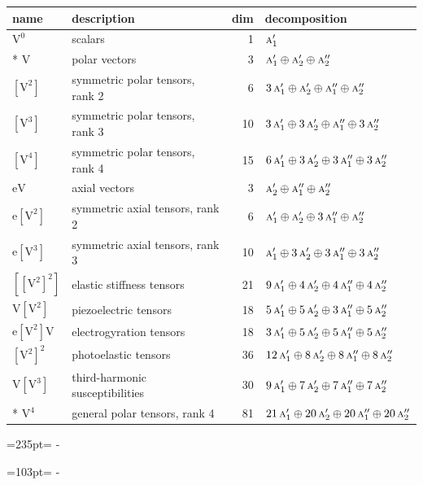 \documentclass[10pt,a4paper]{article}
\newcommand{\needspace}[1]{\par\penalty-100\begingroup\dimen0=#1\relax\dimen2=\pagegoal
  \advance\dimen2-\pagetotal\ifdim\dimen0>\dimen2\relax\ifdim\dimen2>0pt\vfil\break\fi\fi
  \endgroup}
\numberwithin{equation}{section}
\newcommand{\irr}[1]{\text{\normalfont\scshape #1}}
\newcommand{\jahn}[1]{\mathrm{#1}}
\newlength{\fillwidth}\newlength{\cellwidth}\newlength{\colwidth}
\begin{document}
{\begin{longtable}{@{}llr>{\RaggedRight\arraybackslash}p{\fillwidth}@{}}
name & description & dim & decomposition\\\midrule\endhead
\bottomrule\endfoot\endlastfoot
$\jahn{V^{0}}$ & scalars & 1 & $\irr{a}_{1}'$\\*
$\jahn{V}$ & polar vectors & 3 & $\irr{a}_{1}' \oplus\allowbreak \irr{a}_{2}' \oplus\allowbreak \irr{a}_{2}''$\\
$\jahn{[V^{2}]}$ & symmetric polar tensors, rank 2 & 6 & $3\,\irr{a}_{1}' \oplus\allowbreak \irr{a}_{2}' \oplus\allowbreak \irr{a}_{1}'' \oplus\allowbreak \irr{a}_{2}''$\\
$\jahn{[V^{3}]}$ & symmetric polar tensors, rank 3 & 10 & $3\,\irr{a}_{1}' \oplus\allowbreak 3\,\irr{a}_{2}' \oplus\allowbreak \irr{a}_{1}'' \oplus\allowbreak 3\,\irr{a}_{2}''$\\
$\jahn{[V^{4}]}$ & symmetric polar tensors, rank 4 & 15 & $6\,\irr{a}_{1}' \oplus\allowbreak 3\,\irr{a}_{2}' \oplus\allowbreak 3\,\irr{a}_{1}'' \oplus\allowbreak 3\,\irr{a}_{2}''$\\
$\jahn{eV}$ & axial vectors & 3 & $\irr{a}_{2}' \oplus\allowbreak \irr{a}_{1}'' \oplus\allowbreak \irr{a}_{2}''$\\
$\jahn{e[V^{2}]}$ & symmetric axial tensors, rank 2 & 6 & $\irr{a}_{1}' \oplus\allowbreak \irr{a}_{2}' \oplus\allowbreak 3\,\irr{a}_{1}'' \oplus\allowbreak \irr{a}_{2}''$\\
$\jahn{e[V^{3}]}$ & symmetric axial tensors, rank 3 & 10 & $\irr{a}_{1}' \oplus\allowbreak 3\,\irr{a}_{2}' \oplus\allowbreak 3\,\irr{a}_{1}'' \oplus\allowbreak 3\,\irr{a}_{2}''$\\
$\jahn{[[V^{2}]^{2}]}$ & elastic stiffness tensors & 21 & $9\,\irr{a}_{1}' \oplus\allowbreak 4\,\irr{a}_{2}' \oplus\allowbreak 4\,\irr{a}_{1}'' \oplus\allowbreak 4\,\irr{a}_{2}''$\\
$\jahn{V[V^{2}]}$ & piezoelectric tensors & 18 & $5\,\irr{a}_{1}' \oplus\allowbreak 5\,\irr{a}_{2}' \oplus\allowbreak 3\,\irr{a}_{1}'' \oplus\allowbreak 5\,\irr{a}_{2}''$\\
$\jahn{e[V^{2}]V}$ & electrogyration tensors & 18 & $3\,\irr{a}_{1}' \oplus\allowbreak 5\,\irr{a}_{2}' \oplus\allowbreak 5\,\irr{a}_{1}'' \oplus\allowbreak 5\,\irr{a}_{2}''$\\
$\jahn{[V^{2}]^{2}}$ & photoelastic tensors & 36 & $12\,\irr{a}_{1}' \oplus\allowbreak 8\,\irr{a}_{2}' \oplus\allowbreak 8\,\irr{a}_{1}'' \oplus\allowbreak 8\,\irr{a}_{2}''$\\
$\jahn{V[V^{3}]}$ & third-harmonic susceptibilities & 30 & $9\,\irr{a}_{1}' \oplus\allowbreak 7\,\irr{a}_{2}' \oplus\allowbreak 7\,\irr{a}_{1}'' \oplus\allowbreak 7\,\irr{a}_{2}''$\\*
$\jahn{V^{4}}$ & general polar tensors, rank 4 & 81 & $21\,\irr{a}_{1}' \oplus\allowbreak 20\,\irr{a}_{2}' \oplus\allowbreak 20\,\irr{a}_{1}'' \oplus\allowbreak 20\,\irr{a}_{2}''$\\
\bottomrule\end{longtable}}
\needspace{235pt}
\needspace{103pt}
\end{document}
